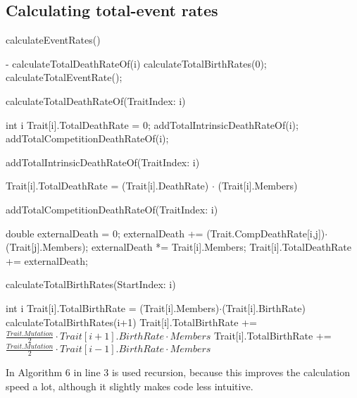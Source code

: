\documentclass{article}
\begin{document}
\subsection{Calculating total-event rates}

\begin{algorithm}[H]
	\caption{calculateEventRates()}
	\begin{algorithmic}[1]
		\REQUIRE -
			\STATE calculateTotalDeathRateOf(i)
		\ENDFOR
		\STATE calculateTotalBirthRates(0);
		\STATE calculateTotalEventRate();
	\end{algorithmic}
\end{algorithm}

\begin{algorithm}[H]
	\caption{calculateTotalDeathRateOf(TraitIndex: i)}
	\begin{algorithmic}[1]
		\REQUIRE int i
		\STATE Trait[i].TotalDeathRate = 0;
		\STATE addTotalIntrinsicDeathRateOf(i);
		\STATE addTotalCompetitionDeathRateOf(i);
	\end{algorithmic}
\end{algorithm}

\begin{algorithm}[H]
	\caption{addTotalIntrinsicDeathRateOf(TraitIndex: i)}
	\begin{algorithmic}[1]
		\STATE Trait[i].TotalDeathRate = (Trait[i].DeathRate) $\cdot$ (Trait[i].Members)
	\end{algorithmic}
\end{algorithm}
\begin{algorithm}[H]
	\caption{addTotalCompetitionDeathRateOf(TraitIndex: i)}
	\begin{algorithmic}[1]
		\STATE double externalDeath = 0;
			\STATE externalDeath += (Trait.CompDeathRate[i,j])$\cdot$(Trait[j].Members);
		\ENDFOR
		\STATE externalDeath *= Trait[i].Members;
		\STATE Trait[i].TotalDeathRate += externalDeath;
	\end{algorithmic}
\end{algorithm}

\begin{algorithm}[H]
	\caption{calculateTotalBirthRates(StartIndex: i)}
	\begin{algorithmic}[1]
		\REQUIRE int i
		\STATE Trait[i].TotalBirthRate = (Trait[i].Members)$\cdot$(Trait[i].BirthRate)
			\STATE calculateTotalBirthRates(i+1)
			\STATE Trait[i].TotalBirthRate += $\frac{Trait.Mutation}{2}\cdot Trait[i+1].BirthRate \cdot Members $
		\ENDIF
			\STATE Trait[i].TotalBirthRate += $\frac{Trait.Mutation}{2}\cdot Trait[i-1].BirthRate \cdot Members $
		\ENDIF
	\end{algorithmic}
\end{algorithm}
In Algorithm 6 in line 3 is used recursion, because this improves the calculation speed a lot, although it slightly makes code less intuitive.
\end{document}
